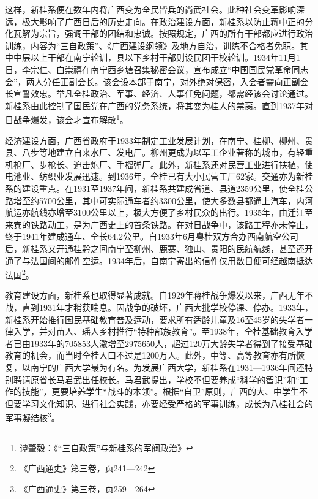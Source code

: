 这样，新桂系便在数年内将广西变为全民皆兵的尚武社会。此种社会变革影响深远，极大影响了广西日后的历史走向。在政治建设方面，新桂系以防止蒋中正的分化瓦解为宗旨，强调干部的团结和忠诚。按照规定，广西的所有干部都应进行政治训练，内容为“三自政策”、《广西建设纲领》及地方自治，训练不合格者免职。其中中层以上干部在南宁轮训，县以下乡村干部则设民团干校轮训。1934年11月1日，李宗仁、白崇禧在南宁西乡塘召集秘密会议，宣布成立“中国国民党革命同志会”，两人分任正副会长。该会设本部于南宁，对外绝对保密，入会者需向正副会长宣誓效忠。举凡全桂政治、军事、经济、人事任免问题，都需经该会讨论通过。新桂系由此控制了国民党在广西的党务系统，将其变为桂人的禁脔。直到1937年对日战争爆发，该会才宣布解散\footnote{谭肇毅：《“三自政策”与新桂系的军阀政治》}。

经济建设方面，广西省政府于1933年制定工业发展计划，在南宁、桂柳、柳州、贵县、八步等地建立自来水厂、发电厂。柳州更成为以军工企业著称的城市，有轻重机枪厂、步枪长、迫击炮厂、手榴弹厂。此外，新桂系还对民营工业进行扶植，使电池业、纺织业发展迅速。到1936年，全桂已有大小民营工厂62家。交通亦为新桂系的建设重点。在1931至1937年间，新桂系共建成省道、县道2359公里，使全桂公路增至约5700公里，其中可实际通车者约3300公里，使大多数县都通上汽车，内河航运亦航线亦增至3100公里以上，极大方便了乡村民众的出行。1935年，由迁江至来宾的铁路动工，是为广西史上的首条铁路。在对日战争中，该路工程亦未停止，终于1941年建成通车、全长64.2公里。自1933年6月粤桂双方合办西南航空公司后，新桂系又开通桂黔之间南宁至柳州、鹿寨、独山、贵阳的民航航线，甚至还开通了与法国间的邮件空运。1934年后，自南宁寄出的信件仅用数日便可经越南抵达法国\footnote{《广西通史》第三卷，页241—242}。

教育建设方面，新桂系也取得显著成就。自1929年蒋桂战争爆发以来，广西无年不战，直到1931年才稍获喘息。因战争的破坏，广西大批学校停课、停办。1933年，新桂系开始推行国民基础教育普及运动，要求所有适龄儿童及16至45岁的失学者一律入学，并对苗人、瑶人乡村推行“特种部族教育”。至1938年，全桂基础教育入学者已由1933年的705853人激增至2975650人，超过120万大龄失学者得到了接受基础教育的机会，而当时全桂人口不过是1200万人。此外，中等、高等教育亦有所恢复，以南宁的广西大学最为有名。为发展广西大学，新桂系在1931—1936年间还特别聘请原省长马君武出任校长。马君武提出，学校不但要养成“科学的智识”和“工作的技能”，更要培养学生“战斗的本领”。根据“自卫”原则，广西的大、中学生不但要学习文化知识、进行社会实践，亦要经受严格的军事训练，成长为八桂社会的军事凝结核\footnote{《广西通史》第三卷，页259—264}。


